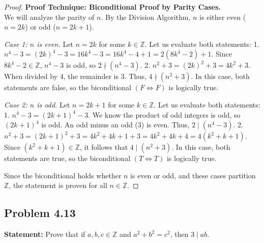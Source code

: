\documentclass[11pt]{article}
\theoremstyle{definition}
\theoremstyle{remark}
\newcommand{\Z}{\mathbb{Z}}
\begin{document}
\begin{proof}
\textbf{Proof Technique: Biconditional Proof by Parity Cases.} \\
We will analyze the parity of $n$. By the Division Algorithm, $n$ is either even ($n=2k$) or odd ($n=2k+1$).

\textit{Case 1: $n$ is even.} Let $n = 2k$ for some $k \in \Z$.
Let us evaluate both statements:
1. $n^4 - 3 = (2k)^4 - 3 = 16k^4 - 3 = 16k^4 - 4 + 1 = 2(8k^4 - 2) + 1$. Since $8k^4 - 2 \in \Z$, $n^4 - 3$ is odd, so $2 \nmid (n^4 - 3)$.
2. $n^2 + 3 = (2k)^2 + 3 = 4k^2 + 3$. When divided by $4$, the remainder is $3$. Thus, $4 \nmid (n^2 + 3)$.
In this case, both statements are false, so the biconditional $(F \iff F)$ is logically true.

\textit{Case 2: $n$ is odd.} Let $n = 2k + 1$ for some $k \in \Z$.
Let us evaluate both statements:
1. $n^4 - 3 = (2k+1)^4 - 3$. We know the product of odd integers is odd, so $(2k+1)^4$ is odd. An odd minus an odd (3) is even. Thus, $2 \mid (n^4 - 3)$.
2. $n^2 + 3 = (2k+1)^2 + 3 = 4k^2 + 4k + 1 + 3 = 4k^2 + 4k + 4 = 4(k^2 + k + 1)$. Since $(k^2 + k + 1) \in \Z$, it follows that $4 \mid (n^2 + 3)$.
In this case, both statements are true, so the biconditional $(T \iff T)$ is logically true.

Since the biconditional holds whether $n$ is even or odd, and these cases partition $\Z$, the statement is proven for all $n \in \Z$.
\end{proof}

\subsection{Problem 4.13}
\textbf{Statement:} Prove that if $a, b, c \in \Z$ and $a^2 + b^2 = c^2$, then $3 \mid ab$.
\end{document}
